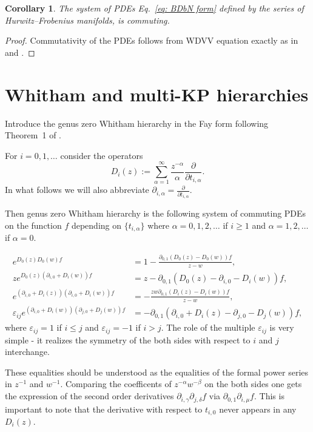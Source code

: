 \documentclass[12pt,a4paper]{amsart}
\newcommand{\p}{{\partial}}
\newcommand{\<}{\left<}
\renewcommand{\>}{\right>}
\newcommand{\eps}{\varepsilon}
\newtheorem{corollary}[theorem]{Corollary}
\numberwithin{equation}{section}
\begin{document}
\begin{corollary}
    The system of PDEs Eq.~\eqref{eq: BDbN form} defined by the series of Hurwitz--Frobenius manifolds, is commuting.
\end{corollary}
\begin{proof}
    Commutativity of the PDEs follows from WDVV equation exactly as in \cite[Section 3.2]{B24} and \cite[Proposition 2.1]{BDbN}.
\end{proof}

\section{Whitham and multi-KP hierarchies}
Introduce the genus zero Whitham hierarchy in the Fay form following Theorem~1 of \cite{TT07}.

For $i =0,1,\dots$ consider the operators
\[
 D_i(z) := \sum_{\alpha = 1}^\infty \frac{z^{-\alpha}}{\alpha} \frac{\p}{\p t_{i,\alpha}}.
\]
In what follows we will also abbreviate $\p_{i,\alpha} = \frac{\p}{\p t_{i,\alpha}}$.

Then genus zero Whitham hierarchy is the following system of commuting PDEs on the function $f$ depending on $\lbrace t_{i,\alpha} \rbrace$ where $\alpha = 0,1,2,\dots$  if $i \ge 1$ and $\alpha = 1,2,\dots$ if $\alpha = 0$.

\begin{align}
    e^{D_0(z)D_0(w)f} &= 1 - \frac{\p_{0,1} (D_0(z) - D_0(w)) f}{z - w},
    \label{Fay-00}
    \\
    z e^{D_0(z)(\p_{i,0} + D_i(w))f} &= z - \p_{0,1} (D_0(z) - \p_{i,0} - D_i(w)) f,
    \label{Fay-0i}
    \\
    e^{(\p_{i,0} +D_i(z))(\p_{i,0} +D_i(w))f} &= - \frac{zw \p_{0,1} (D_i(z) - D_i(w)) f}{z - w},
    \label{Fay-ii}
    \\
    \eps_{ij} e^{(\p_{i,0} + D_i(w))(\p_{j,0} + D_j(w))f} &= - \p_{0,1} (\p_{i,0}+ D_i(z) - \p_{j,0} - D_j(w)) f,
    \label{Fay-ij}
\end{align}
where $\eps_{ij} = 1$ if $i \le j$ and $\eps_{ij} = -1$ if $i > j$. The role of the multiple $\eps_{ij}$ is very simple - it realizes the symmetry of the both sides with respect to $i$ and $j$ interchange.

These equalities should be understood as the equalities of the formal power series in $z^{-1}$ and $w^{-1}$. Comparing the coefficents of $z^{-\alpha}w^{-\beta}$ on the both sides one gets the expression of the second order derivatives $\p_{i,\gamma}\p_{j,\delta}f$ via $\p_{0,1}\p_{i,\mu}f$.
This is important to note that the derivative with respect to $t_{i,0}$ never appears in any $D_i(z)$.
\end{document}
